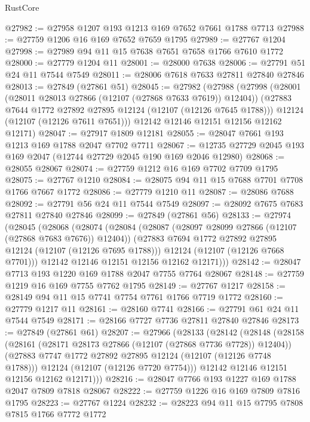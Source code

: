 \begin{lexlean}{RustCore}
\begin{coremodule}
@27982 := @27958 @1207 @193 @1213 @169 @7652 @7661 @1788 @7713
@27988 := @27759 @1206 @16 @169 @7652 @7659 @1795
@27989 := @27767 @1204
@27998 := @27989 @94 @11 @15 @7638 @7651 @7658 @1766 @7610 @1772
@28000 := @27779 @1204 @11
@28001 := @28000 @7638
@28006 := @27791 @51 @24 @11 @7544 @7549
@28011 := @28006 @7618 @7633 @27811 @27840 @27846
@28013 := @27849 (@27861 @51)
@28045 := @27982
    (@27988
      (@27998
        (@28001 (@28011 @28013 @27866 (@12107 (@27868 @7633 @7619)) @12404))
        (@27883 @7644 @1772 @27892 @27895 @12124 (@12107 (@12126 @7645 @1788)))
        @12124
        (@12107 (@12126 @7611 @7651)))
      @12142
      @12146
      @12151
      @12156
      @12162
      @12171)
@28047 := @27917 @1809 @12181
@28055 := @28047 @7661 @193 @1213 @169 @1788 @2047 @7702 @7711
@28067 := @12735 @27729 @2045 @193 @169 @2047 (@12744 @27729 @2045 @190 @169 @2046 @12980)
@28068 := @28055 @28067
@28074 := @27759 @1212 @16 @169 @7702 @7709 @1795
@28075 := @27767 @1210
@28084 := @28075 @94 @11 @15 @7688 @7701 @7708 @1766 @7667 @1772
@28086 := @27779 @1210 @11
@28087 := @28086 @7688
@28092 := @27791 @56 @24 @11 @7544 @7549
@28097 := @28092 @7675 @7683 @27811 @27840 @27846
@28099 := @27849 (@27861 @56)
@28133 := @27974
    (@28045
      (@28068
        (@28074
          (@28084
            (@28087 (@28097 @28099 @27866 (@12107 (@27868 @7683 @7676)) @12404))
            (@27883 @7694 @1772 @27892 @27895 @12124 (@12107 (@12126 @7695 @1788)))
            @12124
            (@12107 (@12126 @7668 @7701)))
          @12142
          @12146
          @12151
          @12156
          @12162
          @12171)))
@28142 := @28047 @7713 @193 @1220 @169 @1788 @2047 @7755 @7764 @28067
@28148 := @27759 @1219 @16 @169 @7755 @7762 @1795
@28149 := @27767 @1217
@28158 := @28149 @94 @11 @15 @7741 @7754 @7761 @1766 @7719 @1772
@28160 := @27779 @1217 @11
@28161 := @28160 @7741
@28166 := @27791 @61 @24 @11 @7544 @7549
@28171 := @28166 @7727 @7736 @27811 @27840 @27846
@28173 := @27849 (@27861 @61)
@28207 := @27966
    (@28133
      (@28142
        (@28148
          (@28158
            (@28161 (@28171 @28173 @27866 (@12107 (@27868 @7736 @7728)) @12404))
            (@27883 @7747 @1772 @27892 @27895 @12124 (@12107 (@12126 @7748 @1788)))
            @12124
            (@12107 (@12126 @7720 @7754)))
          @12142
          @12146
          @12151
          @12156
          @12162
          @12171)))
@28216 := @28047 @7766 @193 @1227 @169 @1788 @2047 @7809 @7818 @28067
@28222 := @27759 @1226 @16 @169 @7809 @7816 @1795
@28223 := @27767 @1224
@28232 := @28223 @94 @11 @15 @7795 @7808 @7815 @1766 @7772 @1772

\end{coremodule}
\end{lexlean}
